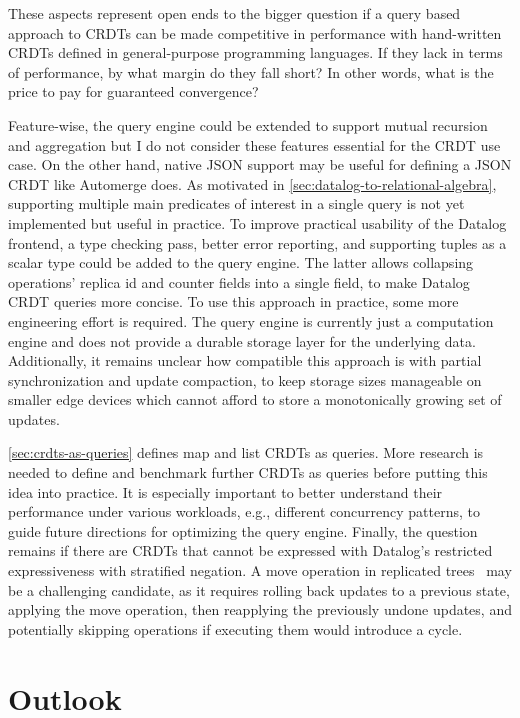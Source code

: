 These aspects represent open ends to the bigger question if a query based
approach to \acp{CRDT} can be made competitive in performance with hand-written
\acp{CRDT} defined in general-purpose programming languages.
If they lack in terms of performance, by what margin do they fall short?
In other words, what is the price to pay for guaranteed convergence?

Feature-wise, the query engine could be extended to support mutual recursion
and aggregation but I do not consider these features essential for the
\ac{CRDT} use case. On the other hand, native JSON support may be useful for
defining a JSON \ac{CRDT} like Automerge does.
As motivated in \ref{sec:datalog-to-relational-algebra}, supporting multiple
main predicates of interest in a single query is not yet implemented but useful
in practice.
To improve practical usability of the Datalog frontend,
a type checking pass, better error reporting, and supporting tuples as a scalar
type could be added to the query engine.
The latter allows collapsing operations' replica id and counter fields
into a single field, to make Datalog \ac{CRDT} queries more concise.
To use this approach in practice, some more engineering effort is required.
The query engine is currently just a computation engine and does not provide
a durable storage layer for the underlying data.
Additionally, it remains unclear how compatible this approach is with
partial synchronization and update compaction, to keep storage sizes manageable
on smaller edge devices which cannot afford to store a monotonically growing
set of updates.

\ref{sec:crdts-as-queries} defines map and list \acp{CRDT} as queries.
More research is needed to define and benchmark further \acp{CRDT} as queries
before putting this idea into practice.
It is especially important to better understand their performance under various
workloads, e.g., different concurrency patterns, to guide future directions for
optimizing the query engine.
Finally, the question remains if there are \acp{CRDT} that cannot be expressed
with Datalog's restricted expressiveness with stratified negation.
A move operation in replicated trees~\cite{moveop1,moveop2} may be a challenging
candidate, as it requires rolling back updates to a previous state,
applying the move operation, then reapplying the previously undone updates,
and potentially skipping operations if executing them would introduce a cycle.

\section{Outlook}\label{sec:outlook}

